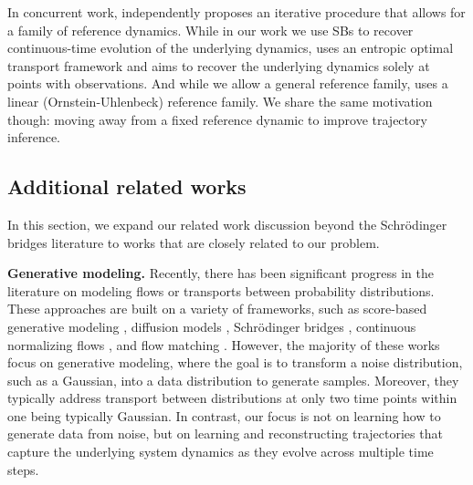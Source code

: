 In concurrent work, \citet{zhang2024joint} independently proposes an iterative procedure that allows for a family of reference dynamics. While in our work we use SBs to recover continuous-time evolution of the underlying dynamics, \citet{zhang2024joint} uses an entropic optimal transport framework and aims to recover the underlying dynamics solely at points with observations. And while we allow a general reference family, \citet{zhang2024joint} uses a linear (Ornstein-Uhlenbeck) reference family. We share the same  motivation though: moving away from a fixed reference dynamic to improve trajectory inference.


\subsection*{Additional related works}
In this section, we expand our related work discussion beyond the Schrödinger bridges literature to works that are closely related to our problem.

\textbf{Generative modeling.} Recently, there has been significant progress in the literature on modeling flows or transports between probability distributions. These approaches are built on a variety of frameworks, such as score-based generative modeling \citep{song2019generative, song2020score}, diffusion models \citep{ho2020denoising}, Schrödinger bridges \citep{de2021diffusion,pavon2021data,Vargas2021,Wang2023}, continuous normalizing flows \citep{chen2018neural,grathwohl2018ffjord}, and flow matching \citep{lipman2022flow}. However, the majority of these works focus on generative modeling, where the goal is to transform a noise distribution, such as a Gaussian, into a data distribution to generate samples. Moreover, they typically address transport between distributions at only two time points within one being typically Gaussian. In contrast, our focus is not on learning how to generate data from noise, but on learning and reconstructing trajectories that capture the underlying system dynamics as they evolve across multiple time steps. 

